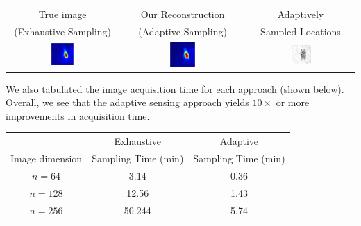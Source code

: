 \documentclass[landscape,final,a0paper,fontscale=0.33]{baposter}
\begin{document}
\begin{poster}
{{        \begin{center}
        \begin{tabular}{ccc}
            True image & Our Reconstruction &  Adaptively \\
            (Exhaustive Sampling) & (Adaptive Sampling) & Sampled Locations \\
        \includegraphics[width=0.21\textwidth]{figures/results/thermal/2014-09-09thermal_x}&
        \includegraphics[width=0.21\textwidth]{figures/results/thermal/2014-09-09thermal_xhat}&
        \includegraphics[width=0.21\textwidth]{figures/python_scripting/thermal_sampleAt}\\
        \end{tabular}
        \end{center}

\noindent We also tabulated the image acquisition time for each approach (shown below).  Overall, we see that the adaptive sensing approach yields $10\times$ or more improvements in acquisition time.       

        \begin{center}
        \begin{tabular}{c|cc}
             & Exhaustive & Adaptive\\
            Image dimension  & Sampling Time (min) & Sampling Time (min)\\
            \hline
            $n=64$ & 3.14 & 0.36 \\
            $n=128$ &  12.56 & 1.43 \\
            $n=256$ & 50.244 & 5.74 \\


\end{tabular}
\end{center}}}
\end{poster}
\end{document}
